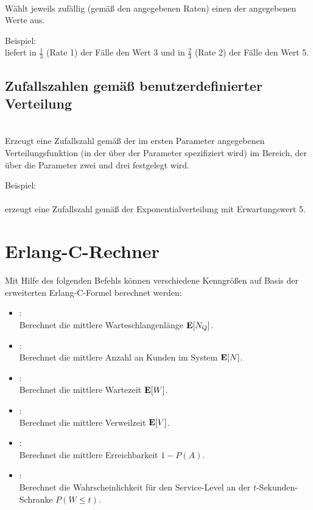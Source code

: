\\
Wählt jeweils zufällig (gemäß den angegebenen Raten) einen der angegebenen Werte aus.

Beispiel:
\\
liefert in $\frac{1}{3}$ (Rate 1) der Fälle den Wert 3 und in $\frac{2}{3}$ (Rate 2) der Fälle den Wert 5.



\section{Zufallszahlen gemäß benutzerdefinierter Verteilung}

\\
Erzeugt eine Zufallszahl gemäß der im ersten Parameter angegebenen Verteilungsfunktion (in der über  der Parameter spezifiziert wird) im Bereich, der über die Parameter zwei und drei festgelegt wird.

Beispiel:\\
\\
erzeugt eine Zufallszahl gemäß der Exponentialverteilung mit Erwartungswert 5.



\chapter{Erlang-C-Rechner}

Mit Hilfe des folgenden Befehls können verschiedene Kenngrößen auf Basis der
erweiterten Erlang-C-Formel berechnet werden:

\begin{itemize}

\item
{}:\\
Berechnet die mittlere Warteschlangenlänge ${\bf E}[N_Q]$. 

\item
{}:\\
Berechnet die mittlere Anzahl an Kunden im System ${\bf E}[N]$.

\item
{}:\\
Berechnet die mittlere Wartezeit ${\bf E}[W]$.

\item
{}:\\
Berechnet die mittlere Verweilzeit ${\bf E}[V]$.

\item
{}:\\
Berechnet die mittlere Erreichbarkeit $1-P(A)$.

\item
{}:\\
Berechnet die Wahrscheinlichkeit für den Service-Level an der $t$-Sekunden-Schranke $P(W\le t)$.

\end{itemize}

